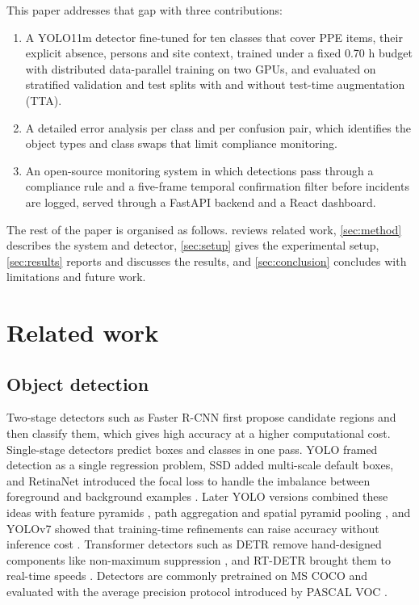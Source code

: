 \documentclass[preprint,12pt]{elsarticle}
\begin{document}
This paper addresses that gap with three contributions:
\begin{enumerate}
\item A YOLO11m detector fine-tuned for ten classes that cover PPE items, their explicit absence, persons and site context, trained under a fixed 0.70 h budget with distributed data-parallel training on two GPUs, and evaluated on stratified validation and test splits with and without test-time augmentation (TTA).
\item A detailed error analysis per class and per confusion pair, which identifies the object types and class swaps that limit compliance monitoring.
\item An open-source monitoring system in which detections pass through a compliance rule and a five-frame temporal confirmation filter before incidents are logged, served through a FastAPI backend and a React dashboard.
\end{enumerate}

The rest of the paper is organised as follows.  reviews related work, \cref{sec:method} describes the system and detector, \cref{sec:setup} gives the experimental setup, \cref{sec:results} reports and discusses the results, and \cref{sec:conclusion} concludes with limitations and future work.

\section{Related work}
\label{sec:related}

\subsection{Object detection}

Two-stage detectors such as Faster R-CNN \cite{ren2017faster} first propose candidate regions and then classify them, which gives high accuracy at a higher computational cost. Single-stage detectors predict boxes and classes in one pass. YOLO \cite{redmon2016yolo} framed detection as a single regression problem, SSD \cite{liu2016ssd} added multi-scale default boxes, and RetinaNet introduced the focal loss to handle the imbalance between foreground and background examples \cite{lin2017focal}. Later YOLO versions combined these ideas with feature pyramids \cite{lin2017fpn}, path aggregation \cite{liu2018panet} and spatial pyramid pooling \cite{he2015spp}, and YOLOv7 showed that training-time refinements can raise accuracy without inference cost \cite{wang2023yolov7}. Transformer detectors such as DETR remove hand-designed components like non-maximum suppression \cite{carion2020detr}, and RT-DETR brought them to real-time speeds \cite{zhao2024rtdetr}. Detectors are commonly pretrained on MS COCO \cite{lin2014coco} and evaluated with the average precision protocol introduced by PASCAL VOC \cite{everingham2010voc}.
\end{document}
